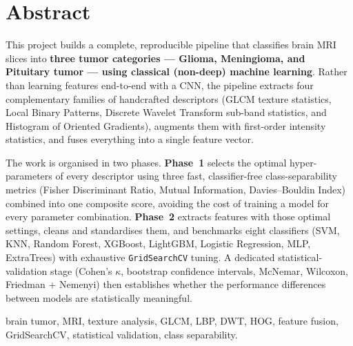 \section*{Abstract}

This project builds a complete, reproducible pipeline that classifies brain MRI slices into
\textbf{three tumor categories --- Glioma, Meningioma, and Pituitary tumor --- using classical
(non-deep) machine learning}. Rather than learning features end-to-end with a CNN, the pipeline
extracts four complementary families of handcrafted descriptors (GLCM texture statistics, Local
Binary Patterns, Discrete Wavelet Transform sub-band statistics, and Histogram of Oriented
Gradients), augments them with first-order intensity statistics, and fuses everything into a single
feature vector.

The work is organised in two phases. \textbf{Phase~1} selects the optimal hyper-parameters of every
descriptor using three fast, classifier-free class-separability metrics (Fisher Discriminant Ratio,
Mutual Information, Davies--Bouldin Index) combined into one composite score, avoiding the cost of
training a model for every parameter combination. \textbf{Phase~2} extracts features with those
optimal settings, cleans and standardises them, and benchmarks eight classifiers (SVM, KNN, Random
Forest, XGBoost, LightGBM, Logistic Regression, MLP, ExtraTrees) with exhaustive \texttt{GridSearchCV}
tuning. A dedicated statistical-validation stage (Cohen's $\kappa$, bootstrap confidence intervals,
McNemar, Wilcoxon, Friedman + Nemenyi) then establishes whether the performance differences between
models are statistically meaningful.

\begin{notebox}[Keywords:]
brain tumor, MRI, texture analysis, GLCM, LBP, DWT, HOG, feature fusion, GridSearchCV,
statistical validation, class separability.
\end{notebox}
\newpage
